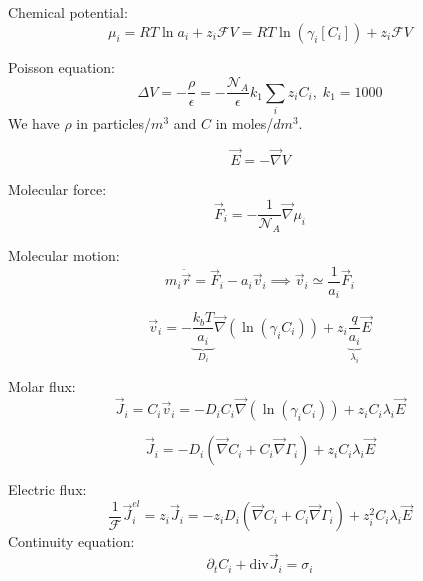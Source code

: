 \documentclass[aps,12pt]{revtex4}
\begin{document}
Chemical potential:
\begin{equation}
	\mu_i = RT \ln a_i + z_i \mathcal{F} V = RT \ln (\gamma_i[C_i]) + z_i \mathcal{F} V
\end{equation}

Poisson equation:
\begin{equation}
	\Delta V = - \dfrac{\rho}{\epsilon} = -\dfrac{\mathcal{N}_A}{\epsilon} k_1 \sum_i z_i C_i,\;k_1=1000
\end{equation}
We have $\rho$ in particles/$m^3$ and $C$ in moles/$dm^3$.

\begin{equation}
	\vec{E} = -\vec{\nabla} V
\end{equation}

Molecular force:	
\begin{equation}
	\vec{F}_i = - \frac{1}{\mathcal{N}_A} \vec{\nabla} \mu_i
\end{equation}

Molecular motion:
\begin{equation}
	m_i \ddot {\vec{r}} = \vec{F}_i - a_i \vec{v}_i \implies \vec{v}_i \simeq \dfrac{1}{a_i} \vec{F}_i
\end{equation}

\begin{equation}
	\vec{v}_i = -\underbrace{\dfrac{k_bT}{a_i}}_{D_i} \vec{\nabla}(\ln(\gamma_i C_i))  + z_i \underbrace{\dfrac{ q}{a_i}}_{\lambda_i} \vec{E}
\end{equation}

Molar flux:
\begin{equation}
\boxed{
	\vec{J}_i = C_i\vec{v}_i = -D_i C_i \vec{\nabla}(\ln(\gamma_i C_i)) + z_i C_i \lambda_i \vec{E}
	}
\end{equation}

\begin{equation}
	\vec{J}_i = - D_i \left( \vec{\nabla} C_i + C_i \vec{\nabla}\Gamma_i \right) + z_i C_i \lambda_i \vec{E}
\end{equation}

Electric flux:
\begin{equation}
	\dfrac{1}{\mathcal{F}} \vec{J}_i^{el} =  z_i \vec{J}_i = - z_i D_i \left( \vec{\nabla} C_i + C_i \vec{\nabla}\Gamma_i \right) + z_i^2 C_i \lambda_i \vec{E}
\end{equation}
Continuity equation:
\begin{equation}
	\partial_t C_i + \mathrm{div} \vec{J}_i = \sigma_i
\end{equation}
\end{document}
